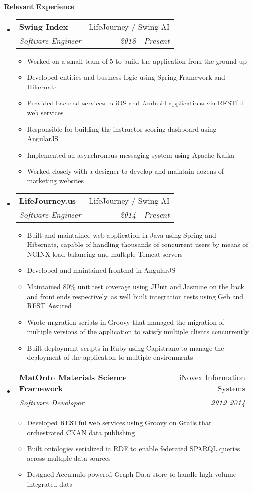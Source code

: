 \documentclass[letterpaper,11pt]{article}
\makeatletter
\newcommand{\resitem}[1]{\item #1 \vspace{-2pt}}
\newcommand{\resheading}[1]{{\large \colorbox{mygrey}{\begin{minipage}{\textwidth}{\textbf{#1 \vphantom{p\^{E}}}}\end{minipage}}}}
\newcommand{\ressubheading}[4]{
    \begin{tabular*}{7.0in}{l@{\extracolsep{\fill}}r}
        \textbf{#1} & #2 \\
        \textit{#3} & \textit{#4} \\
    \end{tabular*}\vspace{-6pt}}
\makeatother
\begin{document}
    \resheading{Relevant Experience}
    \begin{itemize}
        \item
        \ressubheading{Swing Index}{LifeJourney / Swing AI}{Software Engineer}{2018 - Present}
        \begin{itemize}
            \resitem{Worked on a small team of 5 to build the application from the ground up}
            \resitem{Developed entities and business logic using Spring Framework and Hibernate}
            \resitem{Provided backend services to iOS and Android applications via RESTful web services}
            \resitem{Responsible for building the instructor scoring dashboard using AngularJS}
            \resitem{Implemented an asynchronous messaging system using Apache Kafka}
            \resitem{Worked closely with a designer to develop and maintain dozens of marketing websites}
        \end{itemize}

        \item
        \ressubheading{LifeJourney.us}{LifeJourney / Swing AI}{Software Engineer}{2014 - Present}
        \begin{itemize}
            \resitem{Built and maintained web application in Java using Spring and Hibernate, capable of handling thousands of concurrent users by means of NGINX load balancing and multiple Tomcat servers}
            \resitem{Developed and maintained frontend in AngularJS}
            \resitem{Maintained 80\% unit test coverage using JUnit and Jasmine on the back and front ends respectively, as well built integration tests using Geb and REST Assured}
            \resitem{Wrote migration scripts in Groovy that managed the migration of multiple versions of the application to satisfy multiple clients concurrently}
            \resitem{Built deployment scripts in Ruby using Capistrano to manage the deployment of the application to multiple environments}
        \end{itemize}

        \item
        \ressubheading{MatOnto Materials Science Framework}{iNovex Information Systems}{Software Developer}{2012-2014}
        \begin{itemize}
            \resitem{Developed RESTful web services using Groovy on Grails that orchestrated CKAN data publishing}
            \resitem{Built ontologies serialized in RDF to enable federated SPARQL queries across multiple data sources}
            \resitem{Designed Accumulo powered Graph Data store to handle high volume integrated data}
        \end{itemize}

    \end{itemize}
\end{document}
